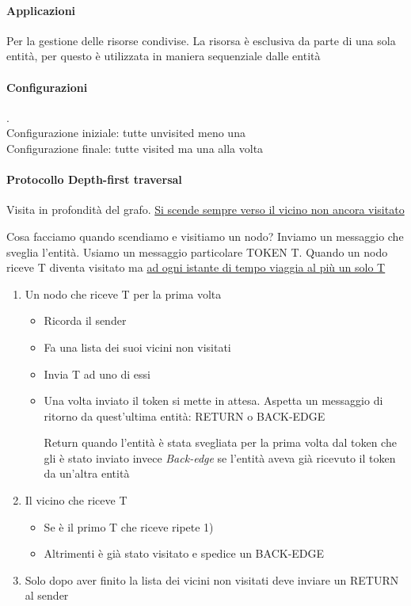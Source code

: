\paragraph{Applicazioni} Per la gestione delle risorse condivise. La risorsa è esclusiva da parte di una sola entità, per questo è utilizzata in maniera sequenziale dalle entità


\paragraph{Configurazioni}.\\
Configurazione iniziale: tutte unvisited meno una\\
Configurazione finale: tutte visited ma una alla volta

\paragraph{Protocollo Depth-first traversal}
Visita in profondità del grafo. \uline{Si scende sempre verso il vicino non ancora visitato}

Cosa facciamo quando scendiamo e visitiamo un nodo? Inviamo un messaggio che sveglia l'entità. Usiamo un messaggio particolare TOKEN T. Quando un nodo riceve T diventa visitato ma \uline{ad ogni istante di tempo viaggia al più un solo T}

\begin{enumerate}
    \item Un nodo che riceve T per la prima volta
    \begin{itemize}
        \item Ricorda il sender
        \item Fa una lista dei suoi vicini non visitati
        \item Invia T ad uno di essi
        \item Una volta inviato il token si mette in attesa. Aspetta un messaggio di ritorno da quest'ultima entità: RETURN o BACK-EDGE

        Return quando l'entità è stata svegliata per la prima volta dal token che gli è stato inviato invece \textit{Back-edge} se l'entità aveva già ricevuto il token da un'altra entità
    \end{itemize}
    \item Il vicino che riceve T
    \begin{itemize}
        \item Se è il primo T che riceve ripete 1)
        \item Altrimenti è già stato visitato e spedice un BACK-EDGE
    \end{itemize}
    \item Solo dopo aver finito la lista dei vicini non visitati deve inviare un RETURN al sender
\end{enumerate}

